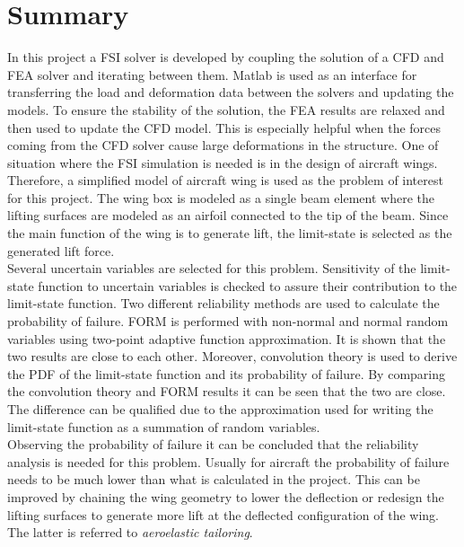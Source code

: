\documentclass[paper=a4, fontsize=12pt]{scrartcl} %
\begin{document}
\section{Summary}
In this project a FSI solver is developed by coupling the solution of a CFD and FEA solver and iterating between them. Matlab is used as an interface for transferring the load and deformation data between the solvers and updating the models. To ensure the stability of the solution, the FEA results are relaxed and then used to update the CFD model. This is especially helpful when the forces coming from the CFD solver cause large deformations in the structure. One of situation where the FSI simulation is needed is in the design of aircraft wings. Therefore, a simplified model of aircraft wing is used as the problem of interest for this project. The wing box is modeled as a single beam element where the lifting surfaces are modeled as an airfoil connected to the tip of the beam. Since the main function of the wing is to generate lift, the limit-state is selected as the generated lift force.\\

Several uncertain variables are selected for this problem. Sensitivity of the limit-state function to uncertain variables is checked to assure their contribution to the limit-state function. Two different reliability methods are used to calculate the probability of failure. FORM is performed with non-normal and normal random variables using two-point adaptive function approximation. It is shown that the two results are close to each other. Moreover, convolution theory is used to derive the PDF of the limit-state function and its probability of failure. By comparing the convolution theory and FORM results it can be seen that the two are close. The difference can be qualified due to the approximation used for writing the limit-state function as a summation of random variables.\\

Observing the probability of failure it can be concluded that the reliability analysis is needed for this problem. Usually for aircraft the probability of failure needs to be much lower than what is calculated in the project. This can be improved by chaining the wing geometry to lower the deflection or redesign the lifting surfaces to generate more lift at the deflected configuration of the wing. The latter is referred to \emph{aeroelastic tailoring}.
  

\end{document}
